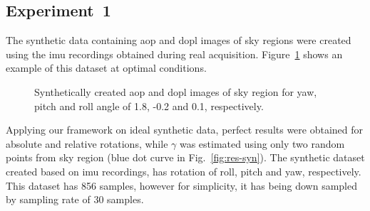 \subsection{Experiment~1}
\label{sec:exp1}
The synthetic data containing \gls{aop} and \gls{dopl} images of sky regions
were created using the \gls{imu} recordings obtained during real acquisition.
Figure~\ref{fig:aop-dop-syn} shows an example of this dataset at
optimal conditions.
\begin{figure}
    \centering
    \hfill
    \label{fig:aop-syn}
    \label{fig:dop-syn}
    \hspace*{\fill}
    \caption{Synthetically created \gls{aop} and \gls{dopl} images of sky
      region for yaw, pitch and roll angle of 1.8, -0.2 and 0.1, respectively.}
    \label{fig:aop-dop-syn}
\end{figure}

Applying our framework on ideal synthetic data, perfect results were obtained
for absolute and relative rotations, while $\gamma$ was estimated using only
two random points from sky region (blue dot curve in Fig.~\ref{fig:res-syn}).
The synthetic dataset created based on \gls{imu} recordings, has rotation of
roll, pitch and yaw, respectively. This dataset has 856 samples, however for
simplicity, it has being down sampled by sampling rate of 30 samples.

